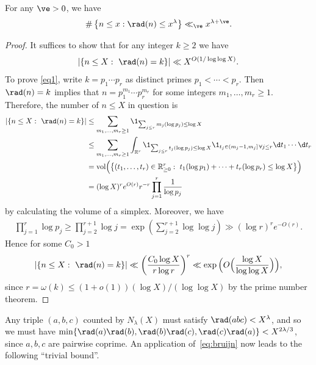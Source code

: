 \begin{lemma}\label{lem:deBruijnRadical}
  For any $\ve>0$, we have
  \begin{equation}\label{eq:bruijn}
    \#\left\{n\leq x : \rad(n)\leq x^\lambda\right\} \ll_\ve x^{\lambda+\ve}.
  \end{equation}
\end{lemma}
\begin{proof}

  It suffices to show that for any integer $k\geq 2$ we have
  \begin{align}\label{eq1}
  |\{n\leq X:\,\, \rad(n)=k\}|\ll X^{O(1/\log \log X)}.
  \end{align}
  To prove \eqref{eq1}, write $k=p_1\cdots p_r$ as distinct primes $p_1<\cdots <p_r$. Then $\rad(n)=k$ implies that $n=p_1^{m_1}\cdots p_{r}^{m_r}$ for some integers $m_1,\ldots, m_r\geq 1$. Therefore, the number of $n\leq X$ in question is
  \begin{align*}
  |\{n\leq X:\,\, \rad(n)=k\}| &\leq \sum_{m_1,\ldots, m_r\geq 1}\1_{\sum_{j\leq r}m_j(\log p_j)\leq \log X}\\
  &\leq \sum_{m_1,\ldots, m_r\geq 1}\int_{\mathbb{R}^r}\1_{\sum_{j\leq r}t_j(\log p_j)\leq \log X}\1_{t_j\in (m_j-1,m_j]\, \forall j\leq r} \d t_1\cdots \d t_r\\
  &=\textnormal{vol}\Big(\big\{(t_1,\ldots, t_r)\in \mathbb{R}_{\geq 0}^r:\,\, t_1(\log p_1)+\cdots +t_r(\log p_r)\leq \log X\big\}\Big)\\
  &=(\log X)^re^{O(r)}r^{-r}\prod_{j=1}^r \frac{1}{\log p_j}
  \end{align*}
  by calculating the volume of a simplex. Moreover, we have
  \begin{align*}
  \prod_{j=1}^r \log p_j\geq \prod_{j=2}^{r+1}\log j=\exp\left(\sum_{j=2}^{r+1}\log \log j\right)\gg (\log r)^{r}e^{-O(r)}.
  \end{align*}
  Hence for some $C_0>1$
  \begin{align*}
  |\{n\leq X:\,\, \rad(n)=k\}| \ll \left(\frac{C_0\log X}{r\log r}\right)^r\ll
  \exp\Big(O\Big(\frac{\log X}{\log\log X}\Big)\Big),
  \end{align*}
  since $r=\omega(k)\leq (1+o(1))(\log X)/(\log \log X)$ by the prime number theorem.

\end{proof}

Any triple $(a,b,c)$ counted by
$N_\lambda(X)$ must satisfy $\rad(abc)< X^{\lambda}$, and so
we must have
$\min\{\rad(a)\rad(b),\rad(b)\rad(c),\rad(c)\rad(a)\}< X^{2\lambda/3}$, since $a,b,c$ are pairwise coprime.
An application of~\eqref{eq:bruijn} now leads to the following ``trivial bound''.

